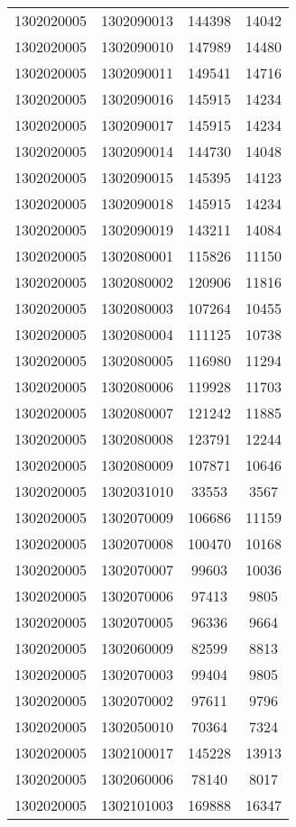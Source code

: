 \begin{longtable}[h]{llcc}
		1302020005 & 1302090013 & 144398 & 14042\\
		1302020005 & 1302090010 & 147989 & 14480\\
		1302020005 & 1302090011 & 149541 & 14716\\
		1302020005 & 1302090016 & 145915 & 14234\\
		1302020005 & 1302090017 & 145915 & 14234\\
		1302020005 & 1302090014 & 144730 & 14048\\
		1302020005 & 1302090015 & 145395 & 14123\\
		1302020005 & 1302090018 & 145915 & 14234\\
		1302020005 & 1302090019 & 143211 & 14084\\
		1302020005 & 1302080001 & 115826 & 11150\\
		1302020005 & 1302080002 & 120906 & 11816\\
		1302020005 & 1302080003 & 107264 & 10455\\
		1302020005 & 1302080004 & 111125 & 10738\\
		1302020005 & 1302080005 & 116980 & 11294\\
		1302020005 & 1302080006 & 119928 & 11703\\
		1302020005 & 1302080007 & 121242 & 11885\\
		1302020005 & 1302080008 & 123791 & 12244\\
		1302020005 & 1302080009 & 107871 & 10646\\
		1302020005 & 1302031010 & 33553 & 3567\\
		1302020005 & 1302070009 & 106686 & 11159\\
		1302020005 & 1302070008 & 100470 & 10168\\
		1302020005 & 1302070007 & 99603 & 10036\\
		1302020005 & 1302070006 & 97413 & 9805\\
		1302020005 & 1302070005 & 96336 & 9664\\
		1302020005 & 1302060009 & 82599 & 8813\\
		1302020005 & 1302070003 & 99404 & 9805\\
		1302020005 & 1302070002 & 97611 & 9796\\
		1302020005 & 1302050010 & 70364 & 7324\\
		1302020005 & 1302100017 & 145228 & 13913\\
		1302020005 & 1302060006 & 78140 & 8017\\
		1302020005 & 1302101003 & 169888 & 16347\\

\end{longtable}
